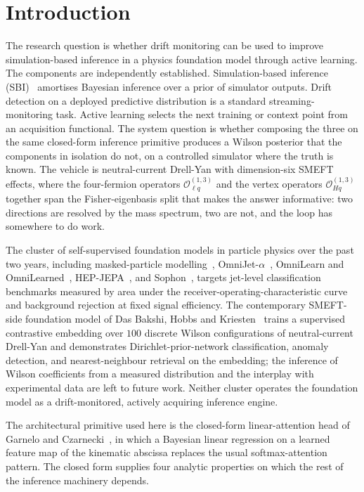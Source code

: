 \documentclass[11pt,a4paper]{article}
\begin{document}
\section{Introduction}
\label{sec:intro}

The research question is whether drift monitoring can be used to improve simulation-based inference in a physics foundation model through active learning. The components are independently established. Simulation-based inference (SBI)~\cite{Cranmer:2020frontiers,TejeroCantero:2020sbi,Hermans:2020nre} amortises Bayesian inference over a prior of simulator outputs. Drift detection on a deployed predictive distribution is a standard streaming-monitoring task. Active learning selects the next training or context point from an acquisition functional. The system question is whether composing the three on the same closed-form inference primitive produces a Wilson posterior that the components in isolation do not, on a controlled simulator where the truth is known. The vehicle is neutral-current Drell-Yan with dimension-six SMEFT effects, where the four-fermion operators $\mathcal{O}_{\ell q}^{(1,3)}$ and the vertex operators $\mathcal{O}_{Hq}^{(1,3)}$ together span the Fisher-eigenbasis split that makes the answer informative: two directions are resolved by the mass spectrum, two are not, and the loop has somewhere to do work.

The cluster of self-supervised foundation models in particle physics over the past two years, including masked-particle modelling~\cite{Heinrich:2024mpm}, OmniJet-$\alpha$~\cite{Birk:2024omnijet}, OmniLearn and OmniLearned~\cite{Mikuni:2024omnilearn,Mikuni:2025omnilearned}, HEP-JEPA~\cite{Bardhan:2025hepjepa}, and Sophon~\cite{Sophon:2024}, targets jet-level classification benchmarks measured by area under the receiver-operating-characteristic curve and background rejection at fixed signal efficiency. The contemporary SMEFT-side foundation model of Das Bakshi, Hobbs and Kriesten~\cite{DasBakshi:2025reusable} trains a supervised contrastive embedding over $100$ discrete Wilson configurations of neutral-current Drell-Yan and demonstrates Dirichlet-prior-network classification, anomaly detection, and nearest-neighbour retrieval on the embedding; the inference of Wilson coefficients from a measured distribution and the interplay with experimental data are left to future work. Neither cluster operates the foundation model as a drift-monitored, actively acquiring inference engine.

The architectural primitive used here is the closed-form linear-attention head of Garnelo and Czarnecki~\cite{Garnelo:2023intention}, in which a Bayesian linear regression on a learned feature map of the kinematic abscissa replaces the usual softmax-attention pattern. The closed form supplies four analytic properties on which the rest of the inference machinery depends.
\end{document}

